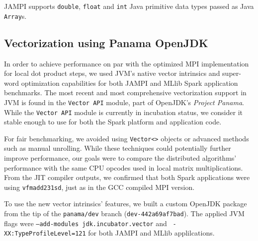\documentclass[fleqn,10pt]{SelfArx} %
\begin{document}
JAMPI supports \texttt{double}, \texttt{float} and \texttt{int} Java primitive data types passed as Java \texttt{Array}s.


\subsection{Vectorization using Panama OpenJDK} %
\label{sub:vector_panama}

In order to achieve performance on par with the optimized MPI implementation for local dot product steps, we used JVM's native vector intrinsics and super-word optimization capabilities for both JAMPI and MLlib Spark application benchmarks. The most recent and most comprehensive vectorization support in JVM is found in the \texttt{Vector API} module, part of OpenJDK's \emph{Project Panama}. While the \texttt{Vector API} module is currently in incubation status, we consider it stable enough to use for both the Spark platform and application code.

For fair benchmarking, we avoided using \texttt{Vector<>} objects or advanced methods such as manual unrolling. While these techniques could potentially further improve performance, our goals were to compare the distributed algorithms' performance with the same CPU opcodes used in local matrix multiplications. From the JIT compiler outputs, we confirmed that both Spark applications were using \texttt{vfmadd231sd}, just as in the GCC compiled MPI version.

To use the new vector intrinsics' features, we built a custom OpenJDK package from the tip of the \texttt{panama/dev} branch (\texttt{dev-442a69af7bad}). The applied JVM flags were \texttt{--add-modules jdk.incubator.vector} and \texttt{ -XX:TypeProfileLevel=121} for both JAMPI and MLlib applilcations. 

\end{document}
